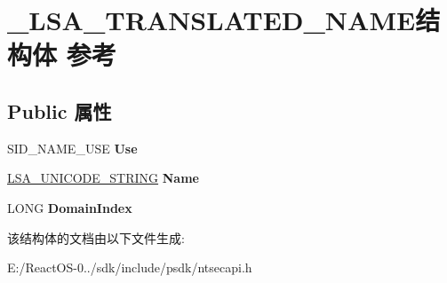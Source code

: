 \hypertarget{struct___l_s_a___t_r_a_n_s_l_a_t_e_d___n_a_m_e}{}\section{\+\_\+\+L\+S\+A\+\_\+\+T\+R\+A\+N\+S\+L\+A\+T\+E\+D\+\_\+\+N\+A\+M\+E结构体 参考}
\label{struct___l_s_a___t_r_a_n_s_l_a_t_e_d___n_a_m_e}
\subsection*{Public 属性}
\begin{DoxyCompactItemize}
\item 
\mbox{\label{struct___l_s_a___t_r_a_n_s_l_a_t_e_d___n_a_m_e_ab3a78c39bc8329af85e0151a4c4b45c8}} 
S\+I\+D\+\_\+\+N\+A\+M\+E\+\_\+\+U\+SE {\bfseries Use}
\item 
\mbox{\label{struct___l_s_a___t_r_a_n_s_l_a_t_e_d___n_a_m_e_aac0de6d2e77cac679bb76ee18033d588}} 
\hyperlink{struct___l_s_a___u_n_i_c_o_d_e___s_t_r_i_n_g}{L\+S\+A\+\_\+\+U\+N\+I\+C\+O\+D\+E\+\_\+\+S\+T\+R\+I\+NG} {\bfseries Name}
\item 
\mbox{\label{struct___l_s_a___t_r_a_n_s_l_a_t_e_d___n_a_m_e_a99cf9b252ec75806d7ca55536d5ed6c0}} 
L\+O\+NG {\bfseries Domain\+Index}
\end{DoxyCompactItemize}


该结构体的文档由以下文件生成\+:\begin{DoxyCompactItemize}
\item 
E\+:/\+React\+O\+S-\/0../sdk/include/psdk/ntsecapi.\+h\end{DoxyCompactItemize}
